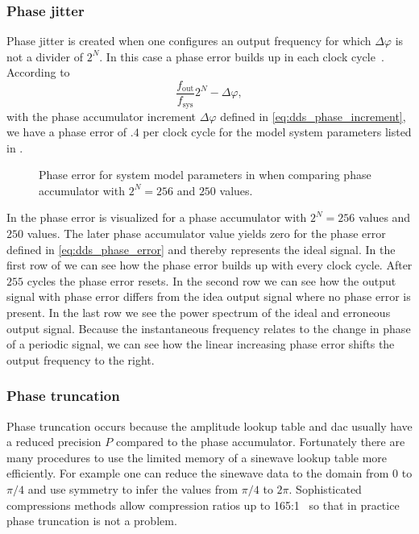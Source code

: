 \subsubsection{Phase jitter}

Phase jitter is created when one configures an output frequency for which
$\Delta\varphi$ is not a divider of $2^N$. In this case a phase error builds
up in each clock cycle~\cite{Vankka2013}. According to
\begin{equation}
  \frac{f_\text{out}}{f_\text{sys}}2^N-\Delta\varphi
  \label{eq:dds_phase_error},
\end{equation}
with the phase accumulator increment $\Delta\varphi$ defined in
\cref{eq:dds_phase_increment}, we have a phase error of $.4$ per clock cycle
for the model system parameters listed in . 
\begin{figure}[htb]
  \centering
  \begin{adjustbox}{width=\textwidth}
    
  \end{adjustbox}
  \caption{Phase error for system model parameters in
     when comparing phase accumulator with
    $2^N=256$ and $250$ values.
  }\label{fig:dds_phase_error}
\end{figure}
In  the phase error is visualized for a phase
accumulator with $2^N=256$ values and $250$ values. The later phase
accumulator value yields zero for the phase error defined in
\cref{eq:dds_phase_error} and thereby represents the ideal signal. In the
first row of  we can see how the phase error builds
up with every clock cycle. After $255$ cycles the phase error resets. In the
second row we can see how the output signal with phase error differs from the
idea output signal where no phase error is present. In the last row we see the
power spectrum of the ideal and erroneous output signal. Because the
instantaneous frequency relates to the change in phase of a periodic signal,
we can see how the linear increasing phase error shifts the output frequency
to the right.

\subsubsection{Phase truncation}

Phase truncation occurs because the amplitude lookup table and \gls{dac}
usually have a reduced precision $P$ compared to the phase accumulator. 
Fortunately there are many procedures to use the limited memory of a sinewave
lookup table more efficiently. For example one can reduce the sinewave data to
the domain from $0$ to $\pi/4$ and use symmetry to infer the values from
$\pi/4$ to $2\pi$. Sophisticated compressions methods allow compression ratios
up to 165:1~\cite{Cordesses2004} so that in practice phase truncation is not a
problem.

